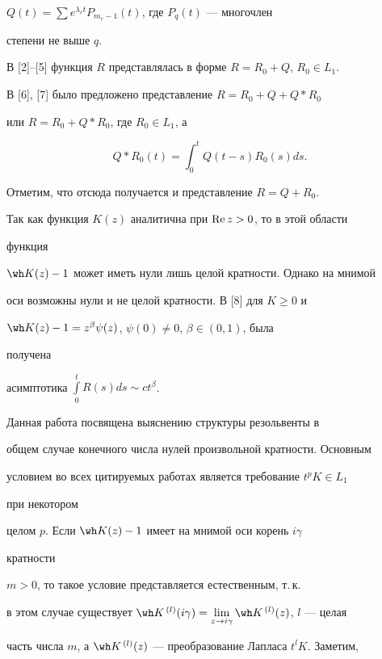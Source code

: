 $Q(t)=\sum e^{\lambda_r t}P_{m_r-1}(t)$, где $P_q(t)$ --- многочлен 


степени не выше $q$. 


 


В [2]--[5] функция $R$ представлялась в форме $R=R_0+Q$, $R_0\in L_1$. 


В [6], [7] было предложено представление $R=R_0+Q+Q*R_0$ 


или $R=R_0+Q*R_0$, где $R_0\in L_1$, а 


$$ 


Q*R_0(t)=\int^t_0 Q(t-s)R_0(s)ds. 


$$ 


Отметим, что отсюда получается и представление $R=Q+R_0$. 


 


Так как функция $K(z)$ аналитична при $\operatorname{Re} z>0$, то в этой области 


функция 


$\wh K(z)-1$ может иметь нули лишь целой кратности. Однако на мнимой 


оси возможны нули и не целой кратности. В [8] для $K\ge0$ и 


$\wh K(z)-1=z^\beta\psi(z)$, $\psi(0)\ne0$, $\beta\in(0,1)$, была 


получена 


асимптотика $\int\limits^t_0 R(s)ds\sim c t^\beta$. 


 


Данная работа посвящена выяснению структуры резольвенты в 


общем случае конечного числа нулей произвольной кратности. Основным 


условием во всех цитируемых работах является требование $t^p K\in L_1$ 


при некотором 


целом $p$. Если $\wh K(z)-1$ имеет на мнимой оси корень $i\gamma$ 


кратности 


$m>0$, то такое условие представляется естественным, т.\,к. 


в этом случае существует $\wh K^{\,(l)}(i\gamma)=\lim\limits_{z\to 


i\gamma}\wh K^{\,(l)}(z)$, $l$ --- целая 


часть числа $m$, а $\wh K^{\,(l)}(z)$ --- преобразование Лапласа $t^l 


K$. Заметим, 



